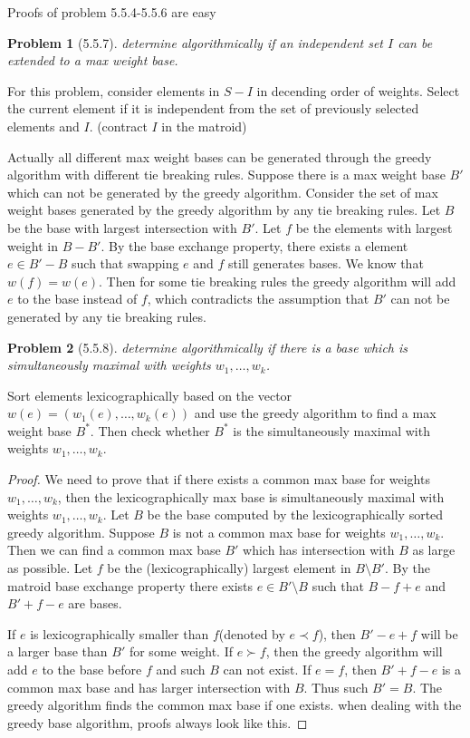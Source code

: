 \documentclass[12pt]{article}
\newtheorem*{nproblem}{Problem}
\begin{document}
Proofs of problem 5.5.4-5.5.6 are easy

\begin{nproblem}[5.5.7]
    determine algorithmically if an independent set $I$ can be extended to a max weight base.
\end{nproblem}
For this problem, consider elements in $S-I$ in decending order of weights. Select the current element if it is independent from the set of previously selected elements and $I$. (contract $I$ in the matroid)

Actually all different max weight bases can be generated through the greedy algorithm with different tie breaking rules. Suppose there is a max weight base $B'$ which can not be generated by the greedy algorithm. Consider the set of max weight bases generated by the greedy algorithm by any tie breaking rules. Let $B$ be the base with largest intersection with $B'$. Let $f$ be the elements with largest weight in $B-B'$. By the base exchange property, there exists a element $e\in B'-B$ such that swapping $e$ and $f$ still generates bases. We know that $w(f)=w(e)$. Then for some tie breaking rules the greedy algorithm will add $e$ to the base instead of $f$, which contradicts the assumption that $B'$ can not be generated by any tie breaking rules.

\begin{nproblem}[5.5.8]
    determine algorithmically if there is a base which is simultaneously maximal with weights $w_1,\dots,w_k$.
\end{nproblem}
Sort elements lexicographically based on the vector $w(e)=(w_1(e),\dots,w_k(e))$ and use the greedy algorithm to find a max weight base $B^*$. Then check whether $B^*$ is the simultaneously maximal with weights $w_1,\dots,w_k$.
\begin{proof}
    We need to prove that if there exists a common max base for weights $w_1,\dots,w_k$, then the lexicographically max base is simultaneously maximal with weights $w_1,\dots,w_k$. 
    Let $B$ be the base computed by the lexicographically sorted greedy algorithm.
    Suppose $B$ is not a common max base for weights $w_1,\dots,w_{k}$. Then we can find a common max base $B'$ which has intersection with $B$ as large as possible. Let $f$ be the (lexicographically) largest element in $B\setminus B'$. By the matroid base exchange property there exists $e\in B'\setminus B$ such that $B-f+e$ and $B'+f-e$ are bases.

    If $e$ is lexicographically smaller than $f$(denoted by $e\prec f$), then $B'-e+f$ will be a larger base than $B'$ for some weight. If $e\succ f$, then the greedy algorithm will add $e$ to the base before $f$ and such $B$ can not exist. If $e=f$, then $B'+f-e$ is a common max base and has larger intersection with $B$. Thus such $B'=B$. The greedy algorithm finds the common max base if one exists.
    \scriptsize{when dealing with the greedy base algorithm, proofs always look like this.}
\end{proof}
\end{document}
